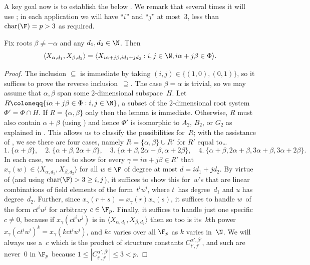 \documentclass[11pt]{article}
\begin{document}
A key goal now is to establish the below .  We remark that several times it will use ; in each application we will have ``$i$'' and ``$j$'' at most~$3$, less than $\mathrm{char}(\F) = p > 3$ as required.
\begin{lemma}\label{rk2gen}
    Fix roots $\beta \neq -\alpha$  and any $d_1,d_2 \in \N$. Then
    \[
        \langle X_{\alpha,d_1},X_{\beta,d_2} \rangle= \langle X_{i\alpha + j\beta,id_1+jd_2}  : i,j \in \N, i\alpha+j\beta \in \Phi \rangle.  
    \]
\end{lemma}
\begin{proof}
    The inclusion $\subseteq$ is immediate by taking $(i,j) \in \{(1,0), (0,1)\}$, so it suffices to prove the reverse inclusion~$\supseteq$.
    The case $\beta = \alpha$ is trivial, so we may assume that $\alpha, \beta$ span some $2$-dimensional subspace~$H$.
    Let $R \coloneqq \{i\alpha + j\beta \in \Phi : i,j \in \N\}$, a subset of the $2$-dimensional root system $\Phi' = \Phi \cap H$.
    If $R = \{\alpha,\beta\}$ only then the lemma is immediate. 
    Otherwise, $R$ must also contain $\alpha + \beta$ (using ) and hence $\Phi'$ is isomorphic to $A_2$, $B_2$, or $G_2$ as explained in .
    This allows us to classify the possibilities for~$R$; 
    with the assistance of , we see there are four cases, namely $R = \{\alpha,\beta\} \cup R'$ for $R'$ equal to\dots
    \[
        1.\ \{\alpha+\beta\}, \quad 
        2.\ \{\alpha+\beta, 2\alpha+\beta\}, \quad
        3.\ \{\alpha+\beta, 2\alpha+\beta,\alpha+2\beta\}, \quad
        4.\ \{\alpha+\beta, 2\alpha+\beta, 3\alpha+\beta, 3\alpha +2\beta\}.
    \]
    In each case, we need to show for every $\gamma =i\alpha + j\beta \in R'$ that $x_{\gamma}(w) \in \langle X_{\alpha,d_1}, X_{\beta,d_2}\rangle$ for all $w \in \F$ of degree at most $d = id_1 + jd_2$.  By virtue of  (and using $\mathrm{char}(\F) > 3 \geq i,j$), it suffices to show this for~$w$'s that are linear combinations of field elements of the form~$t^iu^j$, where $t$~has degree~$d_1$ and $u$ has degree~$d_2$.  Further, since $x_\gamma(r+s) = x_\gamma(r)x_\gamma(s)$, it suffices to handle $w$~of the form $c t^i u^j$ for arbitrary $c \in \F_p$.  Finally, it suffices to handle just one specific $c \neq 0$, because if $x_\gamma(c t^i u^j)$ is in $\langle X_{\alpha,d_1}, X_{\beta,d_2}\rangle$ then so too is its~$k$th power $x_\gamma(c t^i u^j)^k = x_\gamma(kc t^i u^j)$, and $kc$ varies over all $\F_p$ as $k$ varies in~$\N$.  We will always use a~$c$ which is the product of structure constants $C^{\alpha',\beta'}_{i',j'}$, and such are never~$0$ in $\F_p$ because $1 \leq |C^{\alpha',\beta'}_{i',j'}| \leq 3  < p$.
    

\end{proof}
\end{document}
